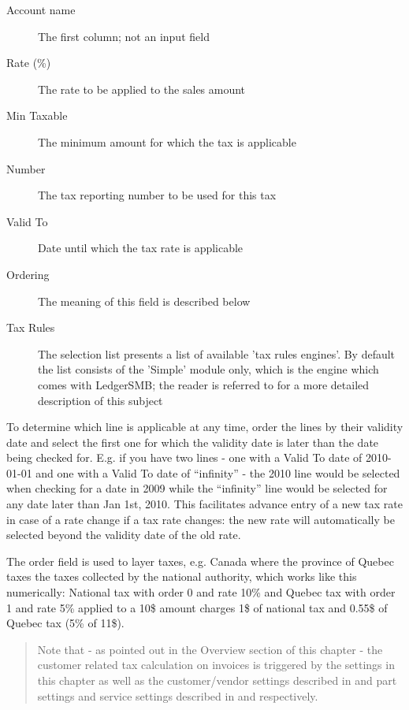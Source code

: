 \begin{description}
\item [Account name] The first column; not an input field
\item [Rate (\%)] The rate to be applied to the sales amount
\item [Min Taxable] The minimum amount for which the tax is applicable
\item [Number] The tax reporting number to be used for this tax
\item [Valid To] Date until which the tax rate is applicable
\item [Ordering] The meaning of this field is described below
\item [Tax Rules] The selection list presents a list of available 'tax rules engines'. By
   default the list consists of the 'Simple' module only, which is the engine which comes
   with LedgerSMB; the reader is referred to  for a more detailed
   description of this subject
\end{description}

To determine which line is applicable at any time, order the lines by their validity date and
select the first one for which the validity date is later than the date being checked for. E.g.
if you have two lines - one with a Valid To date of 2010-01-01 and one with a Valid To date of
``infinity'' - the 2010 line would be selected when checking for a date in 2009 while the ``infinity''
line would be selected for any date later than Jan 1st, 2010. This facilitates advance entry of a new
tax rate in case of a rate change if a tax rate changes: the new rate will automatically be selected
beyond the validity date of the old rate.

The order field is used to layer taxes, e.g. Canada where the province of Quebec taxes
the taxes collected by the national authority, which works like this numerically:
National tax with order 0 and rate 10\% and Quebec tax with order 1 and rate 5\%
applied to a 10\$ amount charges 1\$ of national tax and 0.55\$ of Quebec tax (5\% of 11\$).

\begin{quote}
Note that - as pointed out in the Overview section of this chapter - the \gls{customer} related
tax calculation on invoices is triggered by the settings in this chapter as well as
the customer/vendor settings described in 
and part settings and service settings described in  and
 respectively.
\end{quote}

